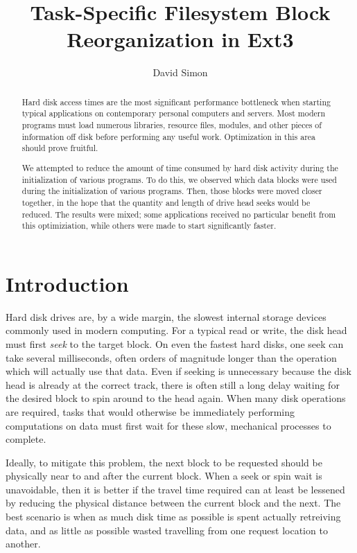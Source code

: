 \documentclass[10pt,twocolumn,letterpaper]{article}
\author{David Simon}
\title{Task-Specific Filesystem Block Reorganization in Ext3}
\begin{document}
\maketitle

\begin{abstract}
Hard disk access times are the most significant performance bottleneck when
starting typical applications on contemporary personal computers and servers.
Most modern programs must load numerous libraries, resource files, modules, and
other pieces of information off disk before performing any useful work. Optimization
in this area should prove fruitful.

We attempted to reduce the amount of time consumed by hard disk activity during
the initialization of various programs. To do this, we observed which data blocks were
used during the initialization of various programs. Then, those blocks were moved
closer together, in the hope that the quantity and length of drive head seeks
would be reduced. The results were mixed; some applications received no particular
benefit from this optimiziation, while others were made to start significantly faster.
\end{abstract}

\section{Introduction}

Hard disk drives are, by a wide margin, the slowest internal storage devices commonly
used in modern computing. For a typical read or write, the disk head must first
\emph{seek} to the target block\cite{seektime}. On even the fastest hard disks\cite{deskstar}, one seek
can take several milliseconds, often orders of magnitude longer than the operation which will actually
use that data. Even if seeking is unnecessary because the disk head is already at the correct track, there is
often still a long delay waiting for the desired block to spin around to the head again\cite{latency}. When
many disk operations are required, tasks that would otherwise be immediately performing computations on data must first wait for these slow, mechanical processes to complete.

Ideally, to mitigate this problem, the next block to be requested should be physically near to
and after the current block\cite{autolocality}. When a seek or
spin wait is unavoidable, then it is better if the travel time required can at least be lessened by reducing the
physical distance between the current block and the next. The best scenario is when
as much disk time as possible is spent actually retreiving data, and as little as possible
wasted travelling from one request location to another.
\end{document}
